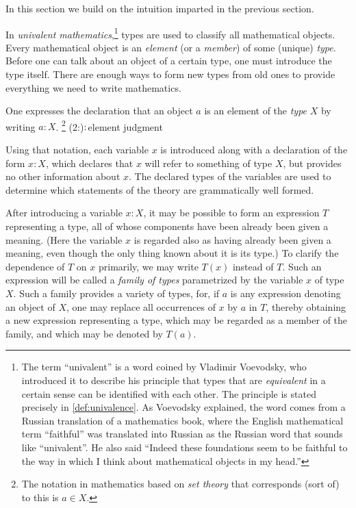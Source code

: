 In this section we build on the intuition imparted in the previous section.

In \emph{univalent mathematics},\footnote{The term ``univalent'' is a word coined by Vladimir Voevodsky, who
introduced it to describe his principle that types that are \emph{equivalent} in a certain sense can be identified with each other.  The
principle is stated precisely in \cref{def:univalence}.  As Voevodsky explained, the word comes from a Russian translation of a mathematics
book, where the English mathematical term ``faithful'' was translated into Russian as the Russian word that sounds like ``univalent''.  He also
said ``Indeed these foundations seem to be faithful to the way in which I think about mathematical objects in my head.''} types are used to
classify all mathematical objects.  Every mathematical object is an \emph{element} (or a \emph{member}) of some (unique) \emph{type}.  Before
one can talk about an object of a certain type, one must introduce the type itself.  There are enough ways to form new types from old ones to
provide everything we need to write mathematics.

One expresses the declaration that an object $a$ is an element of the \emph{type} $X$ by writing $a:X$.%
\footnote{The notation in mathematics based on \emph{set theory} that corresponds (sort of) to this is $a \in X$.}
\glossary(2:){${:}$}{element judgment}

Using that notation, each variable $x$ is introduced along with a declaration of the form $x:X$, which declares that $x$ will refer to something
of type $X$, but provides no other information about $x$.  The declared types of the variables are used to determine which statements of the
theory are grammatically well formed.

After introducing a variable $x:X$, it may be possible to form an expression $T$ representing a type, all of whose components have
been already been given a meaning.
(Here the variable $x$ is regarded also as having already been given a meaning, even though the only thing known about it is its type.)
To clarify the dependence of $T$ on $x$ primarily, we may write $T(x)$ instead of $T$.
Such an expression will be called a \emph{family of types}  parametrized by the variable $x$ of type $X$.
Such a family provides a variety of types, for, if $a$ is any expression denoting an object of $X$, one may replace all
occurrences of $x$ by $a$ in $T$, thereby obtaining a new expression representing a type, which may be regarded as a member of the family,
and which may be denoted by $T(a)$.

